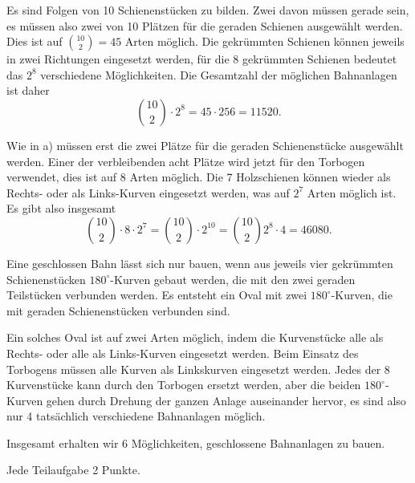 \begin{loesung}
\begin{teilaufgaben}
\item
Es sind Folgen von 10 Schienenstücken zu bilden.
Zwei davon müssen gerade sein, es müssen also zwei von 10 Plätzen für die
geraden Schienen ausgewählt werden.
Dies ist auf $\binom{10}{2}=45$ Arten möglich.
Die gekrümmten Schienen können jeweils in zwei Richtungen eingesetzt werden,
für die 8 gekrümmten Schienen bedeutet das $2^8$ verschiedene Möglichkeiten.
Die Gesamtzahl der möglichen Bahnanlagen ist daher
\[
\binom{10}{2}\cdot 2^8 = 45\cdot 256=11520.
\]
\item
Wie in a) müssen erst die zwei Plätze für die geraden Schienenstücke 
ausgewählt werden.
Einer der verbleibenden acht Plätze wird jetzt für den Torbogen verwendet,
dies ist auf 8 Arten möglich.
Die 7 Holzschienen können wieder als Rechts- oder als Links-Kurven eingesetzt
werden, was auf $2^7$ Arten möglich ist.
Es gibt also insgesamt
\[
\binom{10}{2}\cdot 8 \cdot 2^7
=
\binom{10}{2}\cdot 2^{10}
=
\binom{10}{2}2^{8}\cdot 4
=
46080.
\]
\item
Eine geschlossen Bahn lässt sich nur bauen, wenn aus jeweils vier 
gekrümmten Schienenstücken $180^\circ$-Kurven gebaut werden, die
mit den zwei geraden Teilstücken verbunden werden.
Es entsteht ein Oval mit zwei $180^\circ$-Kurven, die mit geraden
Schienenstücken verbunden sind.

Ein solches Oval ist auf zwei Arten möglich, indem die Kurvenstücke
alle als Rechts- oder alle als Links-Kurven eingesetzt werden.
Beim Einsatz des Torbogens müssen alle Kurven als Linkskurven eingesetzt
werden.
Jedes der 8 Kurvenstücke kann durch den Torbogen ersetzt werden, aber
die beiden $180^\circ$-Kurven gehen durch Drehung der ganzen Anlage 
auseinander hervor, es sind also nur 4 tatsächlich verschiedene Bahnanlagen
möglich.

Insgesamt erhalten wir 6 Möglichkeiten, geschlossene Bahnanlagen zu bauen.
\qedhere
\end{teilaufgaben}
\end{loesung}

\begin{bewertung}
Jede Teilaufgabe 2 Punkte.
\end{bewertung}




